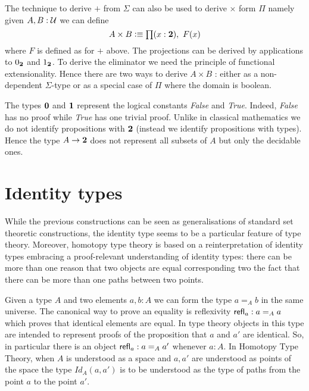 The technique to derive $+$ from $\Sigma$ can also be used to derive
$\times$ form $\Pi$ namely given $A,B:\mathcal{U}$ we can define 
\[ A \times B \defeq \prd{x:\bool}F(x)\] where $F$ is defined as for
$+$ above. The projections can be derived by applications to $0_{\mathbf{2}}$
and $1_{\mathbf{2}}$. To derive the eliminator we need the principle of
functional extensionality. Hence there are two ways to derive $A\times
B$ : either as a non-dependent $\Sigma$-type or as a special case of
$\Pi$ where the domain is boolean.

The types $\mathbf{0}$ and $\mathbf{1}$ represent the logical constants
\emph{False} and \emph{True}. Indeed, \emph{False} has no proof while
\emph{True} has one trivial proof. Unlike in classical mathematics we
do not identify propositions with $\mathbf{2}$ (instead we identify
propositions with types). Hence the type $A \to \mathbf{2}$ does not
represent all subsets of $A$ but only the decidable ones.


\section{Identity types}
\label{sec:identity-types}

While the previous constructions can be seen as generalisations of
standard set theoretic constructions, the identity type seems to be
a particular feature of type theory. Moreover, homotopy type theory is
based on a reinterpretation of identity types embracing a
proof-relevant understanding of identity types: there can be more than
one reason that two objects are equal corresponding two the fact that
there can be more than one paths between two points.

Given a type $A$ and two elements $a,b:A$ we can form the type $a=_A
b$ in the same universe. The canonical way to prove an equality is
reflexivity $\mathsf{refl}_{a} : a =_A a$ which proves that identical elements
are equal. In type theory objects in this type are intended to
represent proofs of the proposition that $a$ and $a'$ are identical.
So, in particular there is an object $\mathsf{refl}_{a}: a =_A a'$ whenever
$a:A$. In Homotopy Type Theory, when $A$ is understood as a space and
$a,a'$ are understood as points of the space the type $Id_A(a,a')$ is
to be understood as the type of paths from the point $a$ to the point
$a'$.

